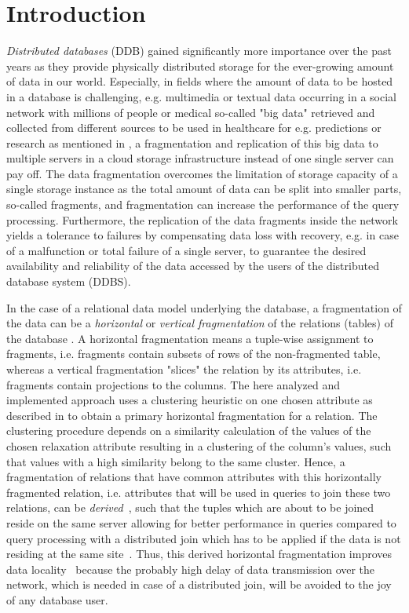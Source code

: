 
\section{Introduction}
\label{sec:intro}

\emph{Distributed databases} (DDB) gained significantly more importance over the past years as they provide physically distributed storage \citep{Tan2009} 
for the ever-growing amount of data in our world. Especially, in fields where the amount of data to be hosted in a database is challenging, e.g. multimedia or 
textual data occurring in a social network with millions of people or medical so-called "big data" retrieved and collected from different sources to be used in
healthcare for e.g. predictions or research as mentioned in \citet{Lee2017}, a fragmentation and replication of this big data to multiple servers in a cloud 
storage infrastructure instead of one single server can pay off. The data fragmentation overcomes the limitation of storage capacity of a single storage
instance as the total amount of data can be split into smaller parts, so-called fragments, and fragmentation can increase the performance of the query 
processing. 
Furthermore, the replication of the data fragments inside the network yields a tolerance to failures by compensating data loss with recovery, e.g. in case of 
a malfunction or total failure of a single server, to guarantee the desired availability and reliability of the data accessed by the users of the distributed 
database system (DDBS).


In the case of a relational data model underlying the database, a fragmentation of the data can be a \emph{horizontal} or \emph{vertical fragmentation} of the
relations (tables) of the database \citep[p.~104f.]{Ozsu1991}. A horizontal fragmentation means a tuple-wise assignment to fragments, i.e. fragments contain 
subsets of rows of the non-fragmented table, whereas a vertical fragmentation "slices" the relation by its attributes, i.e. fragments contain projections 
to the columns. 
The here analyzed and implemented approach uses a clustering heuristic on one chosen attribute as described in \citet{Wiese2014} to obtain a primary
horizontal fragmentation for a relation. The clustering procedure depends on a similarity calculation of the values of the chosen relaxation attribute 
resulting in a clustering of the column's values, such that values with a high similarity belong to the same cluster. Hence, a fragmentation of relations that 
have common attributes with this horizontally fragmented relation, i.e. attributes that will be used in queries to join these two relations, can be 
\emph{derived}~\citep[p.~116f.]{Ozsu1991}, such that the tuples which are about to be joined reside on the same server allowing for better performance in 
queries compared to query processing with a distributed join which has to be applied if the data is not residing at the same site~\citep{Sattler2009}.
Thus, this derived horizontal fragmentation improves data locality~\citep{Wiese2014} because the probably high delay of data transmission over the network, 
which is needed in case of a distributed join, will be avoided to the joy of any database user.


